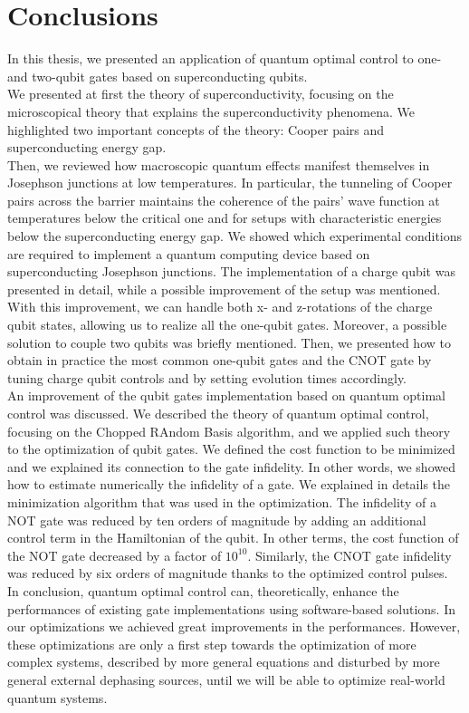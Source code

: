 \documentclass[../main/main.tex]{subfiles}
\begin{document}
\chapter*{Conclusions}
In this thesis, we presented an application of quantum optimal control to one- and two-qubit gates based on superconducting qubits.\\
We presented at first the theory of superconductivity, focusing on the microscopical theory that explains the superconductivity phenomena. We highlighted two important concepts of the theory: Cooper pairs and superconducting energy gap.\\
Then, we reviewed how macroscopic quantum effects manifest themselves in Josephson junctions at low temperatures. In particular, the tunneling of Cooper pairs across the barrier maintains the coherence of the pairs' wave function at temperatures below the critical one and for setups with characteristic energies below the superconducting energy gap. We showed which experimental conditions are required to implement a quantum computing device based on superconducting Josephson junctions. The implementation of a charge qubit was presented in detail, while a possible improvement of the setup was mentioned. With this improvement, we can handle both x- and z-rotations of the charge qubit states, allowing us to realize all the one-qubit gates. Moreover, a possible solution to couple two qubits was briefly mentioned. Then, we presented how to obtain in practice the most common one-qubit gates and the CNOT gate by tuning charge qubit controls and by setting evolution times accordingly.\\
An improvement of the qubit gates implementation based on quantum optimal control was discussed. We described the theory of quantum optimal control, focusing on the Chopped RAndom Basis algorithm, and we applied such theory to the optimization of qubit gates. We defined the cost function to be minimized and we explained its connection to the gate infidelity. In other words, we showed how to estimate numerically the infidelity of a gate. We explained in details the minimization algorithm that was used in the optimization. The infidelity of a NOT gate was reduced by ten orders of magnitude by adding an additional control term in the Hamiltonian of the qubit. In other terms, the cost function of the NOT gate decreased by a factor of $10^{10}$. Similarly, the CNOT gate infidelity was reduced by six orders of magnitude thanks to the optimized control pulses.\\
In conclusion, quantum optimal control can, theoretically, enhance the performances of existing gate implementations using software-based solutions. In our optimizations we achieved great improvements in the performances. However, these optimizations are only a first step towards the optimization of more complex systems, described by more general equations and disturbed by more general external dephasing sources, until we will be able to optimize real-world quantum systems.
\end{document}
